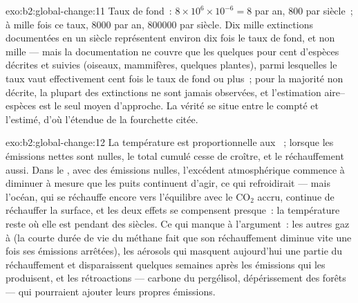\begin{solution}{exo:b2:global-change:11}
Taux de fond~: $8\times 10^{6}\times 10^{-6} = 8$ par an, 800 par
siècle~; à mille fois ce taux, 8000 par an, \num{800000} par siècle. Dix
mille extinctions documentées en un siècle représentent environ dix fois
le taux de fond, et non mille --- mais la documentation ne couvre que les
quelques pour cent d'espèces décrites et suivies (oiseaux, mammifères,
quelques plantes), parmi lesquelles le taux vaut effectivement cent fois
le taux de fond ou plus~; pour la majorité non décrite, la plupart des
extinctions ne sont jamais observées, et l'estimation aire--espèces est
le seul moyen d'approche. La vérité se situe entre le compté et l'estimé,
d'où l'étendue de la fourchette citée.
\end{solution}

\begin{solution}{exo:b2:global-change:12}
La température est proportionnelle aux ~; lorsque les
émissions nettes sont nulles, le total cumulé cesse de croître, et le
réchauffement aussi. Dans le , avec des émissions
nulles, l'excédent atmosphérique commence à diminuer à mesure que les
puits continuent d'agir, ce qui refroidirait --- mais l'océan, qui se
réchauffe encore vers l'équilibre avec le \ensuremath{\mathrm{CO_2}} accru,
continue de réchauffer la surface, et les deux effets se compensent
presque~: la température reste où elle est pendant des siècles. Ce qui
manque à l'argument~: les autres gaz à  (la courte durée de
vie du méthane fait que son réchauffement diminue vite une fois ses
émissions arrêtées), les aérosols qui masquent aujourd'hui une partie du
réchauffement et disparaissent quelques semaines après les émissions qui
les produisent, et les rétroactions --- carbone du pergélisol,
dépérissement des forêts --- qui pourraient ajouter leurs propres
émissions.
\end{solution}

